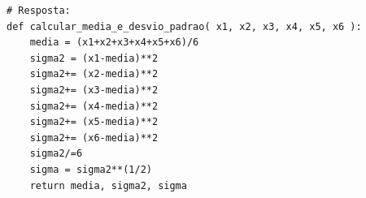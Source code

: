 \ifmostrarGabarito
\begin{verbatim}
# Resposta:
def calcular_media_e_desvio_padrao( x1, x2, x3, x4, x5, x6 ):
    media = (x1+x2+x3+x4+x5+x6)/6
    sigma2 = (x1-media)**2
    sigma2+= (x2-media)**2
    sigma2+= (x3-media)**2
    sigma2+= (x4-media)**2
    sigma2+= (x5-media)**2
    sigma2+= (x6-media)**2
    sigma2/=6
    sigma = sigma2**(1/2)
    return media, sigma2, sigma
\end{verbatim}
\fi
